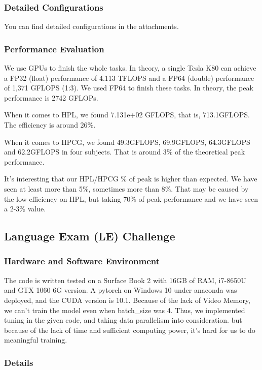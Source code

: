 \documentclass[a4paper, 11pt]{article}
\begin{document}
		\subsubsection{Detailed Configurations} You can find detailed configurations in the attachments.
		\subsubsection{Performance Evaluation} 
			We use GPUs to finish the whole tasks. In theory, a single Tesla K80 can achieve a FP32 (float) performance of 4.113 TFLOPS and a FP64 (double) performance of 1,371 GFLOPS (1:3). We used FP64 to finish these tasks. In theory, the peak performance is 2742 GFLOPs. 
			
			When it comes to HPL, we found 7.131e+02 GFLOPS, that is, 713.1GFLOPS. The efficiency is around 26\%.
			
			When it comes to HPCG\cite{dongarra2016high}, we found 49.3GFLOPS, 69.9GFLOPS, 64.3GFLOPS and 62.2GFLOPS in four subjects. That is around 3\% of the theoretical peak performance.
			
			It's interesting that our HPL/HPCG \% of peak is higher than expected. We have seen at least more than 5\%, sometimes more than 8\%. That may be caused by the low efficiency on HPL, but taking 70\% of peak performance and we have seen a 2-3\% value.
		
		
		
		
		
		
		
		
		\subsection{Language Exam (LE) Challenge}
			\subsubsection{Hardware and Software Environment}
			
				The code is written tested on a Surface Book 2 with 16GB of RAM, i7-8650U and GTX 1060 6G version. A pytorch on Windows 10 under anaconda was deployed, and the CUDA version is 10.1. 
				Because of the lack of Video Memory, we can't train the model even when batch\_size was 4. Thus, we implemented tuning in the given code, and taking data parallelism into consideration. but because of the lack of time and sufficient computing power, it's hard for us to do meaningful training.
				
			\subsubsection{Details}
			
\end{document}

